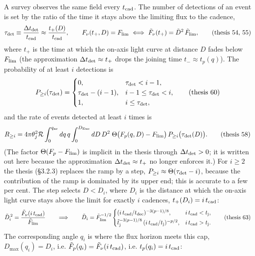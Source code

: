 \documentclass[11pt,a4paper]{article}
\newcommand{\tD}{\tilde{D}}
\newcommand{\tF}{\tilde{F}}
\newcommand{\ttj}{\tilde{t}_{\rm j}}
\newcommand{\Euc}{{\rm Euc}}
\newcommand{\nr}{{\rm nr}}
\newcommand{\Flim}{F_{\rm lim}}
\newcommand{\tFlim}{\tilde{F}_{\rm lim}}
\newcommand{\tcad}{t_{\rm cad}}
\newcommand{\tdec}{t_{\rm dec}}
\newcommand{\tj}{t_{\rm j}}
\begin{document}
A survey observes the same field every $\tcad$. The number of detections of an event is set by the ratio of the time it stays above the limiting flux to the cadence,
\begin{equation}
\tau_{\rm det}\equiv\frac{\Delta t_{\rm det}}{\tcad}\approx\frac{t_+(D)}{\tcad},\qquad F_\nu(t_+,D)=\Flim\ \Longleftrightarrow\ \tF_\nu(t_+)=\tD^2\,\tFlim,
\tag{thesis 54, 55}
\end{equation}
where $t_+$ is the time at which the on-axis light curve at distance $D$ fades below $\Flim$ (the approximation $\Delta t_{\rm det}\approx t_+$ drops the joining time $t_-\approx t_p(q)$). The probability of at least $i$ detections is
\begin{equation}
P_{\geq i}(\tau_{\rm det})=\begin{cases}0, & \tau_{\rm det}<i-1,\\ \tau_{\rm det}-(i-1), & i-1\le\tau_{\rm det}<i,\\ 1, & i\le\tau_{\rm det},\end{cases}
\tag{thesis 60}
\end{equation}
and the rate of events detected at least $i$ times is
\begin{equation}
R_{\geq i}=4\pi\theta_j^2\mathcal R\int_0^{q_\nr}dq\,q\int_0^{D_\Euc}dD\,D^2\;\Theta\bigl(F_p(q,D)-\Flim\bigr)\,P_{\geq i}\bigl(\tau_{\rm det}(D)\bigr).
\tag{thesis 58}
\end{equation}
(The factor $\Theta(F_p-\Flim)$ is implicit in the thesis through $\Delta t_{\rm det}>0$; it is written out here because the approximation $\Delta t_{\rm det}\approx t_+$ no longer enforces it.) For $i\geq2$ the thesis (\S3.2.3) replaces the ramp by a step, $P_{\geq i}\approx\Theta(\tau_{\rm det}-i)$, because the contribution of the ramp is dominated by its upper end; this is accurate to a few per cent. The step selects $D<D_i$, where $D_i$ is the distance at which the on-axis light curve stays above the limit for exactly $i$ cadences, $t_+(D_i)=i\,\tcad$:
\begin{equation}
\label{eq:Di}
\tD_i^{\,2}=\frac{\tF_\nu(i\,\tcad)}{\tFlim}
\qquad\Longrightarrow\qquad
\tD_i=\tFlim^{-1/2}\begin{cases}(i\,\tcad/\tdec)^{-3(p-1)/8}, & i\,\tcad<\tj,\\[2pt] \ttj^{-3(p-1)/8}\,(i\,\tcad/\tj)^{-p/2}, & i\,\tcad>\tj .\end{cases}
\tag{thesis 63}
\end{equation}
The corresponding angle $q_i$ is where the flux horizon meets this cap, $D_{\max}(q_i)=D_i$, i.e. $\tF_p(q_i)=\tF_\nu(i\,\tcad)$, i.e. $t_p(q_i)=i\,\tcad$:
\end{document}

